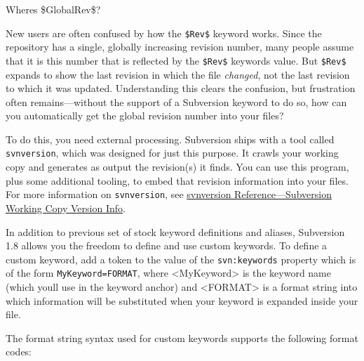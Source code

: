Where\textquotesingle s \$GlobalRev\$?

New users are often confused by how the \texttt{\$Rev\$} keyword works.
Since the repository has a single, globally increasing revision number,
many people assume that it is this number that is reflected by the
\texttt{\$Rev\$} keyword\textquotesingle s value. But \texttt{\$Rev\$}
expands to show the last revision in which the file \emph{changed}, not
the last revision to which it was updated. Understanding this clears the
confusion, but frustration often remains---without the support of a
Subversion keyword to do so, how can you automatically get the global
revision number into your files?

To do this, you need external processing. Subversion ships with a tool
called \texttt{svnversion}, which was designed for just this purpose. It
crawls your working copy and generates as output the revision(s) it
finds. You can use this program, plus some additional tooling, to embed
that revision information into your files. For more information on
\texttt{svnversion}, see \hyperref[svn.ref.svnversion]{svnversion
Reference---Subversion Working Copy Version Info}.

In addition to previous set of stock keyword definitions and aliases,
Subversion 1.8 allows you the freedom to define and use custom keywords.
To define a custom keyword, add a token to the value of the
\texttt{svn:keywords} property which is of the form
\texttt{MyKeyword=FORMAT}, where \textless MyKeyword\textgreater{} is
the keyword name (which you\textquotesingle ll use in the keyword
anchor) and \textless FORMAT\textgreater{} is a format string into which
information will be substituted when your keyword is expanded inside
your file.

The format string syntax used for custom keywords supports the following
format codes:

